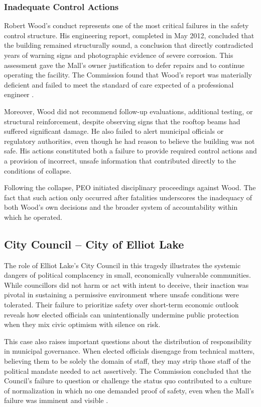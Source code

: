 \documentclass[12pt]{article}
\begin{document}
\subsubsection*{Inadequate Control Actions}

Robert Wood's conduct represents one of the most critical failures in the safety control structure. His engineering report, completed in May 2012, concluded that the building remained structurally sound, a conclusion that directly contradicted years of warning signs and photographic evidence of severe corrosion. This assessment gave the Mall's owner justification to defer repairs and to continue operating the facility. The Commission found that Wood's report was materially deficient and failed to meet the standard of care expected of a professional engineer \cite[p393-394]{AlgoLakeReport1}.

Moreover, Wood did not recommend follow-up evaluations, additional testing, or structural reinforcement, despite observing signs that the rooftop beams had suffered significant damage. He also failed to alert municipal officials or regulatory authorities, even though he had reason to believe the building was not safe. His actions constituted both a failure to provide required control actions and a provision of incorrect, unsafe information that contributed directly to the conditions of collapse.

Following the collapse, PEO initiated disciplinary proceedings against Wood. The fact that such action only occurred after fatalities underscores the inadequacy of both Wood's own decisions and the broader system of accountability within which he operated.

\subsection{City Council – City of Elliot Lake}
The role of Elliot Lake's City Council in this tragedy illustrates the systemic dangers of political complacency in small, economically vulnerable communities. While councillors did not harm or act with intent to deceive, their inaction was pivotal in sustaining a permissive environment where unsafe conditions were tolerated. Their failure to prioritize safety over short-term economic outlook reveals how elected officials can unintentionally undermine public protection when they mix civic optimism with silence on risk.

This case also raises important questions about the distribution of responsibility in municipal governance. When elected officials disengage from technical matters, believing them to be solely the domain of staff, they may strip those staff of the political mandate needed to act assertively. The Commission concluded that the Council's failure to question or challenge the status quo contributed to a culture of normalization in which no one demanded proof of safety, even when the Mall's failure was imminent and visible \cite[p375-377]{AlgoLakeReport1}.
\end{document}
